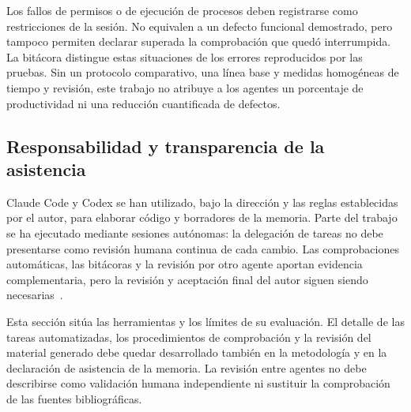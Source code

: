 Los fallos de permisos o de ejecución de procesos deben registrarse como
restricciones de la sesión. No equivalen a un defecto funcional demostrado,
pero tampoco permiten declarar superada la comprobación que quedó interrumpida.
La bitácora distingue estas situaciones de los errores reproducidos por las
pruebas. Sin un protocolo comparativo, una línea base y medidas homogéneas de
tiempo y revisión, este trabajo no atribuye a los agentes un porcentaje de
productividad ni una reducción cuantificada de defectos.

\subsection{Responsabilidad y transparencia de la asistencia}

Claude Code y Codex se han utilizado, bajo la dirección y las reglas establecidas
por el autor, para elaborar código y borradores de la memoria. Parte del trabajo
se ha ejecutado mediante sesiones autónomas: la delegación de tareas no debe
presentarse como revisión humana continua de cada cambio. Las comprobaciones
automáticas, las bitácoras y la revisión por otro agente aportan evidencia
complementaria, pero la revisión y aceptación final del autor siguen siendo
necesarias~\cite{codex_scde_agent_evidence}.

Esta sección sitúa las herramientas y los límites de su evaluación. El detalle
de las tareas automatizadas, los procedimientos de comprobación y la revisión
del material generado debe quedar desarrollado también en la metodología y en
la declaración de asistencia de la memoria. La revisión entre agentes no debe
describirse como validación humana independiente ni sustituir la comprobación
de las fuentes bibliográficas.
